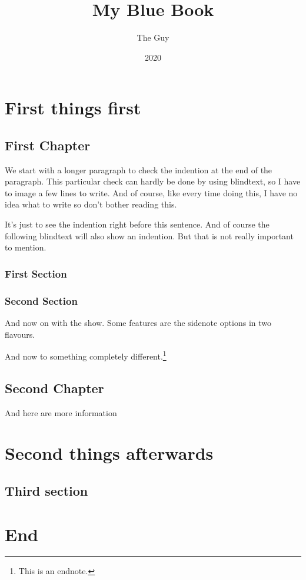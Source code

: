 \documentclass[english]{tex/bluebook}
\title{My Blue Book}
\author{The Guy}
\date{2020}
\begin{document}
	\maketitle	
	\frontmatter
	\tableofcontents

	\mainmatter
	\part{First things first}
	\chapter{First Chapter}
	We start with a longer paragraph to check the indention at the end of the paragraph.
	This particular check can hardly be done by using blindtext, so I have to image a few lines to write. And of course, like every time doing this, I have no idea what to write so don't bother reading this.
	
	It's just to see the indention right before this sentence. And of course the following blindtext will also show an indention. But that is not really important to mention.
	
	\blindtext[2]
	\section{First Section}
	\blindtext[15]
	\section{Second Section}
	And now on with the show. Some features are the sidenote options in two flavours.
	\blindtext[15]
	
	And now to something completely different.\footnote{This is an endnote.}
	
	\chapter{Second Chapter}
	And here are more information 
	\blindtext[25]
	\part{Second things afterwards}
	\chapter{Third section}
	\blindtext[30]
	
	\part{End}
	\printendnotes	
	\printindex
	\cleardoubleemptypage
\end{document}
